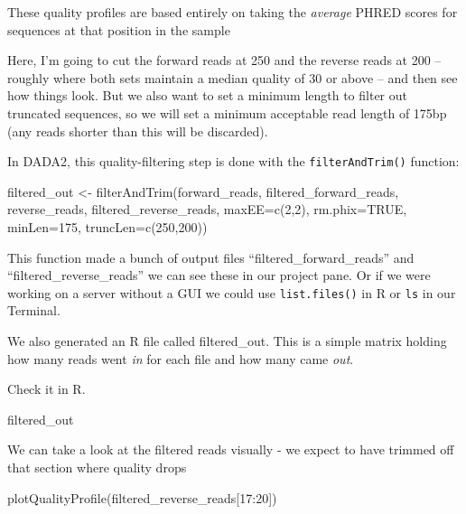 \documentclass[
]{book}
\newenvironment{Shaded}{\begin{snugshade}}{\end{snugshade}}
\newcommand{\AttributeTok}[1]{\textcolor[rgb]{0.77,0.63,0.00}{#1}}
\newcommand{\ConstantTok}[1]{\textcolor[rgb]{0.00,0.00,0.00}{#1}}
\newcommand{\DecValTok}[1]{\textcolor[rgb]{0.00,0.00,0.81}{#1}}
\newcommand{\FunctionTok}[1]{\textcolor[rgb]{0.00,0.00,0.00}{#1}}
\newcommand{\NormalTok}[1]{#1}
\newcommand{\OtherTok}[1]{\textcolor[rgb]{0.56,0.35,0.01}{#1}}
\newcommand{\SpecialCharTok}[1]{\textcolor[rgb]{0.00,0.00,0.00}{#1}}
\begin{document}
These quality profiles are based entirely on taking the \emph{average} PHRED scores for sequences at that position in the sample

Here, I'm going to cut the forward reads at 250 and the reverse reads at 200 -- roughly where both sets maintain a median quality of 30 or above -- and then see how things look. But we also want to set a minimum length to filter out truncated sequences, so we will set a minimum acceptable read length of 175bp (any reads shorter than this will be discarded).

In DADA2, this quality-filtering step is done with the \texttt{filterAndTrim()} function:

\begin{Shaded}
\begin{Highlighting}[]
\NormalTok{    filtered\_out }\OtherTok{\textless{}{-}} \FunctionTok{filterAndTrim}\NormalTok{(forward\_reads, filtered\_forward\_reads,}
\NormalTok{                    reverse\_reads, filtered\_reverse\_reads, }\AttributeTok{maxEE=}\FunctionTok{c}\NormalTok{(}\DecValTok{2}\NormalTok{,}\DecValTok{2}\NormalTok{),}
                    \AttributeTok{rm.phix=}\ConstantTok{TRUE}\NormalTok{, }\AttributeTok{minLen=}\DecValTok{175}\NormalTok{, }\AttributeTok{truncLen=}\FunctionTok{c}\NormalTok{(}\DecValTok{250}\NormalTok{,}\DecValTok{200}\NormalTok{))}
\end{Highlighting}
\end{Shaded}

This function made a bunch of output files ``filtered\_forward\_reads'' and ``filtered\_reverse\_reads'' we can see these in our project pane. Or if we were working on a server without a GUI we could use \texttt{list.files()} in R or \texttt{ls} in our Terminal.

We also generated an R file called filtered\_out. This is a simple matrix holding how many reads went \emph{in} for each file and how many came \emph{out}.

Check it in R.

\begin{Shaded}
\begin{Highlighting}[]
\NormalTok{    filtered\_out}
\end{Highlighting}
\end{Shaded}

We can take a look at the filtered reads visually - we expect to have trimmed off that section where quality drops

\begin{Shaded}
\begin{Highlighting}[]
    \FunctionTok{plotQualityProfile}\NormalTok{(filtered\_reverse\_reads[}\DecValTok{17}\SpecialCharTok{:}\DecValTok{20}\NormalTok{])}
\end{Highlighting}
\end{Shaded}
\end{document}
